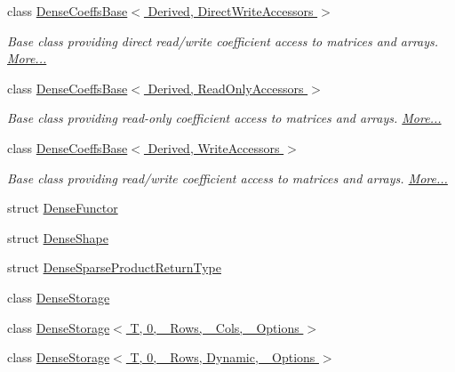 \begin{DoxyCompactItemize}
class \hyperlink{group___core___module_class_eigen_1_1_dense_coeffs_base_3_01_derived_00_01_direct_write_accessors_01_4}{Dense\+Coeffs\+Base$<$ Derived, Direct\+Write\+Accessors $>$}
\begin{DoxyCompactList}\small\item\em Base class providing direct read/write coefficient access to matrices and arrays.  \hyperlink{group___core___module_class_eigen_1_1_dense_coeffs_base_3_01_derived_00_01_direct_write_accessors_01_4}{More...}\end{DoxyCompactList}\item 
class \hyperlink{group___core___module_class_eigen_1_1_dense_coeffs_base_3_01_derived_00_01_read_only_accessors_01_4}{Dense\+Coeffs\+Base$<$ Derived, Read\+Only\+Accessors $>$}
\begin{DoxyCompactList}\small\item\em Base class providing read-\/only coefficient access to matrices and arrays.  \hyperlink{group___core___module_class_eigen_1_1_dense_coeffs_base_3_01_derived_00_01_read_only_accessors_01_4}{More...}\end{DoxyCompactList}\item 
class \hyperlink{group___core___module_class_eigen_1_1_dense_coeffs_base_3_01_derived_00_01_write_accessors_01_4}{Dense\+Coeffs\+Base$<$ Derived, Write\+Accessors $>$}
\begin{DoxyCompactList}\small\item\em Base class providing read/write coefficient access to matrices and arrays.  \hyperlink{group___core___module_class_eigen_1_1_dense_coeffs_base_3_01_derived_00_01_write_accessors_01_4}{More...}\end{DoxyCompactList}\item 
struct \hyperlink{struct_eigen_1_1_dense_functor}{Dense\+Functor}
\item 
struct \hyperlink{struct_eigen_1_1_dense_shape}{Dense\+Shape}
\item 
struct \hyperlink{struct_eigen_1_1_dense_sparse_product_return_type}{Dense\+Sparse\+Product\+Return\+Type}
\item 
class \hyperlink{class_eigen_1_1_dense_storage}{Dense\+Storage}
\item 
class \hyperlink{class_eigen_1_1_dense_storage_3_01_t_00_010_00_01___rows_00_01___cols_00_01___options_01_4}{Dense\+Storage$<$ T, 0, \+\_\+\+Rows, \+\_\+\+Cols, \+\_\+\+Options $>$}
\item 
class \hyperlink{class_eigen_1_1_dense_storage_3_01_t_00_010_00_01___rows_00_01_dynamic_00_01___options_01_4}{Dense\+Storage$<$ T, 0, \+\_\+\+Rows, Dynamic, \+\_\+\+Options $>$}

\end{DoxyCompactItemize}
